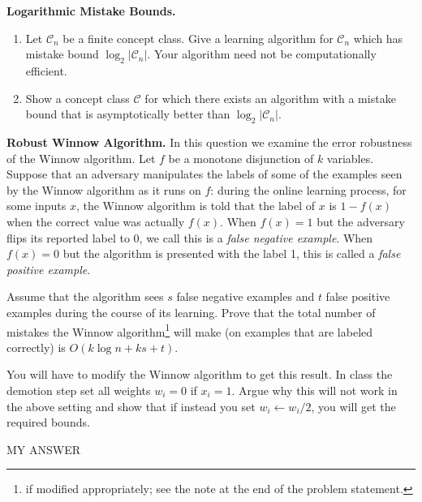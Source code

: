 \documentclass[11pt]{article}
\newcommand*{\C}{{\mathcal C}}
\DeclareMathOperator{\1}{\mathbbm{1}}
\begin{document}
\begin{problem} [10pts] \textbf{Logarithmic Mistake Bounds.} \quad
	\begin{enumerate}[label=\alph*)]
		\item Let $\C_n$ be a finite concept class.  Give a learning
		algorithm for $\C_n$ which has mistake bound $\log_2|\C_n|.$  Your algorithm
		need not be computationally efficient.
		\item Show a concept class $\C$ for which there exists an algorithm with a mistake bound that is asymptotically better than $\log_2|\C_n|$.
	\end{enumerate}


\end{problem}

\begin{problem}[15 points] \textbf{Robust Winnow Algorithm.}
	In this question we examine the error robustness of the Winnow algorithm. Let $f$ be a monotone disjunction of $k$ variables. Suppose that an adversary manipulates the labels of some of the examples seen by the Winnow algorithm as it runs on $f$: during the online learning process, for some inputs $x$, the Winnow algorithm is told that the label of $x$ is $1-f(x)$ when the correct value was actually $f(x)$. When $f(x) = 1$ but the adversary flips its reported label to 0, we call this is a \emph{false negative example}. When $f(x) = 0$ but the algorithm is presented with the label 1, this is called a \emph{false positive example}.
	
Assume that the algorithm sees $s$ false negative examples and $t$ false positive examples during the course of its learning. Prove that the total number of mistakes the Winnow algorithm\footnote{if modified appropriately; see the note at the end of the problem statement.} will make (on examples that are labeled correctly) is $O(k \log{n} + ks + t)$.
\end{problem}
\begin{note}
	You will have to modify the Winnow algorithm to get this result. In class
	the demotion step set all weights $w_i = 0$ if $x_i = 1$. Argue why this will
	not work in the above setting and show that if instead you set $w_i \leftarrow
	w_i/2$, you will get the required bounds.
\end{note}

MY ANSWER
\end{document}
